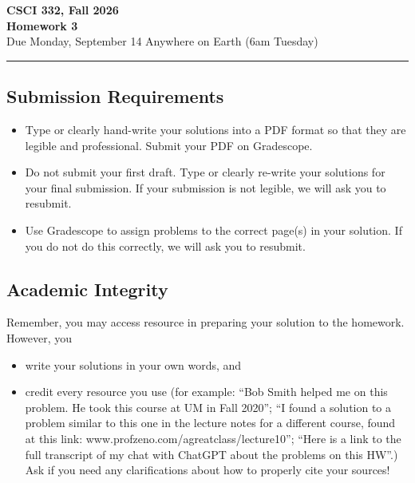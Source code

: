 \documentclass[11pt]{article}
\begin{document}
\begin{center}
\Large\textbf{CSCI 332, Fall 2026}%
\\
\LARGE\textbf{Homework 3}%
\\[0.5ex]
\large Due Monday, September 14 Anywhere on Earth (6am Tuesday)
\end{center}

\bigskip
\hrule
\bigskip

\subsection*{Submission Requirements}
\begin{itemize}
    \item Type or clearly hand-write your solutions into a PDF format so that they are legible and professional. Submit your PDF on Gradescope. 
    \item Do not submit your first draft. Type or clearly re-write your solutions for your final submission. If your submission is not legible, we will ask you to resubmit.
    \item Use Gradescope to assign problems to the correct page(s) in your solution. If you do not do this correctly, we will ask you to resubmit.
\end{itemize}

\subsection*{Academic Integrity}

Remember, you may access  resource in preparing your solution to the homework. However, you 
\begin{itemize}
    \item write your solutions in your own words, and
    \item credit every resource you use (for example: ``Bob Smith helped me on
    this problem. He took this course at UM in Fall 2020''; ``I found a solution
    to a problem similar to this one in the lecture notes for a different
    course, found at this link: www.profzeno.com/agreatclass/lecture10''; ``Here is a link to the full transcript of my chat with ChatGPT about the problems on this HW''.)
    Ask if you need any clarifications about how to properly cite your sources!
\end{itemize}




\newpage
\end{document}
